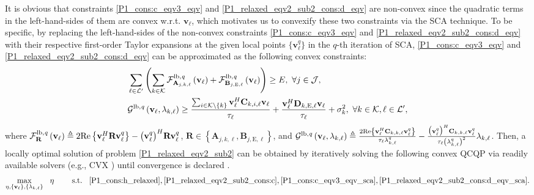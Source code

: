 \documentclass[12pt,draftclsnofoot, onecolumn]{IEEEtran}
\theoremstyle{plain}
\begin{document}
\begin{sloppypar}
It is obvious that constraints \eqref{P1_cons:c_eqv3_eqv} and \eqref{P1_relaxed_eqv2_sub2_cons:d_eqv} are non-convex since the quadratic terms in the left-hand-sides of them are convex w.r.t. $\mathbf v_\ell$, which motivates us to convexify these two constraints via the SCA technique. To be specific, by replacing the left-hand-sides of the non-convex constraints \eqref{P1_cons:c_eqv3_eqv} and \eqref{P1_relaxed_eqv2_sub2_cons:d_eqv} with their respective first-order Taylor expansions at the given local points $\{\mathbf v_\ell^q\}$ in the $q$-th iteration of SCA, \eqref{P1_cons:c_eqv3_eqv} and \eqref{P1_relaxed_eqv2_sub2_cons:d_eqv} can be approximated as the following convex constraints: 
\begin{align}
& \sum_{\ell\in\mathcal L'}\left(\sum_{k\in\mathcal K} \mathcal F^{\rm lb,\it q}_{\mathbf A_{j,k,\ell}}\left(\mathbf v_\ell\right) + \mathcal F^{\rm lb,\it q}_{\mathbf B_{j,\mathrm E,\ell}}\left(\mathbf v_\ell\right)\right) \geq E, \ \forall j\in\mathcal J, \label{P1_cons:c_eqv3_eqv_sca}\\
& \mathcal G^{\rm lb, \it q}\left(\mathbf v_\ell, \lambda_{k,\ell}\right) \geq \frac{\sum_{i\in \mathcal K\backslash\{k\}}\mathbf v_\ell^H\mathbf C_{k,i,\ell} \mathbf v_\ell}{\tau_\ell} + \frac{\mathbf v_\ell^H\mathbf D_{k,\mathrm E,\ell}\mathbf v_\ell}{\tau_\ell} + \sigma_k^2, \ \forall k\in\mathcal K, \ell\in\mathcal L', \label{P1_relaxed_eqv2_sub2_cons:d_eqv_sca}
\end{align}%
where $\mathcal F^{\rm lb,\it q}_{\mathbf R}\left(\mathbf v_\ell\right) \triangleq 2{\rm Re}\left\lbrace \mathbf v_\ell^H\mathbf R\mathbf v_\ell^q\right\rbrace - \big(\mathbf v_\ell^q\big)^H\mathbf R\mathbf v_\ell^q$, $\mathbf R \in \left\lbrace\mathbf A_{j,k,\ell}, \mathbf B_{j,\mathrm E,\ell} \right\rbrace$, and $\mathcal G^{\rm lb, \it q}\left(\mathbf v_\ell, \lambda_{k,\ell}\right) \triangleq \frac{2{\rm Re}\left\lbrace\mathbf v_\ell^H\mathbf C_{k,k,\ell}\mathbf v_\ell^q\right\rbrace}{\tau_\ell\lambda_{k,\ell}^q} - \frac{\big(\mathbf v_\ell^q\big)^H\mathbf C_{k,k,\ell}\mathbf v_\ell^q}{\tau_\ell\left( \lambda_{k,\ell}^q\right)^2}\lambda_{k,\ell}$. Then, a locally optimal solution of problem \eqref{P1_relaxed_eqv2_sub2} can be obtained by iteratively solving the following convex QCQP via readily available solvers (e.g., CVX \cite{2004_S.Boyd_cvx}) until convergence is declared \cite{2010_Dinh_SCA_converge}.
\begin{align}\label{P1_relaxed_eqv2_sub2_sca}
\underset{\eta,\{\mathbf v_\ell\},\{\lambda_{k,\ell}\}}{\max} \hspace{3mm} \eta \hspace{8mm}
\text{s.t.} \hspace{3mm}  \eqref{P1_cons:h_relaxed}, \eqref{P1_relaxed_eqv2_sub2_cons:c}, \eqref{P1_cons:c_eqv3_eqv_sca}, \eqref{P1_relaxed_eqv2_sub2_cons:d_eqv_sca}. 
\end{align}%


\end{sloppypar}
\end{document}
